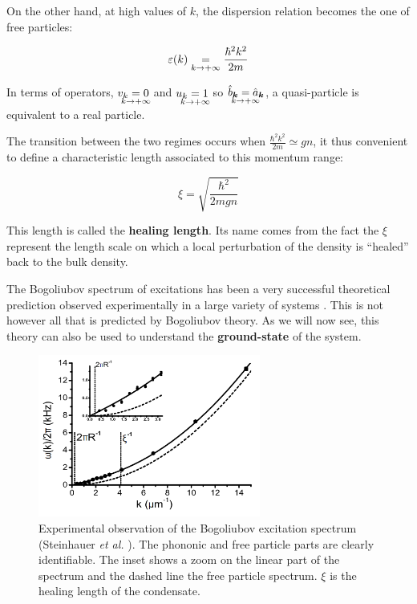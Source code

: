 On the other hand, at high values of $k$, the dispersion relation becomes the one of free particles:

\begin{equation}
    \varepsilon(k) \underrel{k \to +\infty}{=} \frac{\hbar^2 k^2}{2m}
\end{equation}

\noindent In terms of operators, $v_k \underrel[c]{k \to +\infty}{=} 0$ and $u_k \underrel[c]{k \to +\infty}{=} 1$ so $\hat{b}_{\bm{k}}\underrel[c]{k \to +\infty}{=}\hat{a}_{\bm{k}}$, a quasi-particle is equivalent to a real particle. 

The transition between the two regimes occurs when $\frac{\hbar^2 k^2}{2m} \simeq gn$, it thus convenient to define a characteristic length associated to this momentum range:

\begin{equation}
    \xi = \sqrt{\frac{\hbar^2}{2mgn}}
\end{equation}

\noindent This length is called the \textbf{healing length}. Its name comes from the fact the $\xi$ represent the length scale on which a local perturbation of the density is ``healed'' back to the bulk density.


The Bogoliubov spectrum of excitations has been a very successful theoretical prediction observed experimentally in a large variety of systems \cite{fontaine2018,miller1962,ozeri2005,steinhauer2002excitation,stepanov2019}. This is not however all that is predicted by Bogoliubov theory. As we will now see, this theory can also be used to understand the \textbf{ground-state} of the system.

\begin{figure}
    \centering
    \includegraphics[width=0.65\textwidth]{Fig/Chapter1/bogo_steinhauer.png}
    \caption{Experimental observation of the Bogoliubov excitation spectrum (Steinhauer {\it et al.} \cite{steinhauer2002excitation}). The phononic and free particle parts are clearly identifiable. The inset shows a zoom on the linear part of the spectrum and the dashed line the free particle spectrum. $\xi$ is the healing length of the condensate.}
    \label{fig:my_label}
\end{figure}

